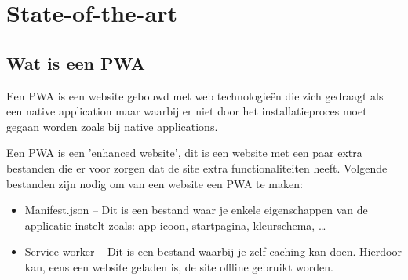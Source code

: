  




\section{State-of-the-art}
\label{sec:state-of-the-art}
\subsection{Wat is een PWA}

Een PWA is een website gebouwd met web technologieën die zich gedraagt als een native application maar waarbij er niet door het installatieproces moet gegaan worden zoals bij native applications.
\autocite{Sayali2018}

Een PWA is een 'enhanced website', dit is een website met een paar extra bestanden die er voor zorgen dat de site extra functionaliteiten heeft. Volgende bestanden zijn nodig om van een website een PWA te maken:
\begin{itemize}
    \item Manifest.json – Dit is een bestand waar je enkele eigenschappen van de applicatie instelt zoals: app icoon, startpagina, kleurschema, …
    \item Service worker – Dit is een bestand waarbij je zelf caching kan doen. Hierdoor kan, eens een website geladen is, de site offline gebruikt worden.
\end{itemize}
\autocite{Harris2017}

